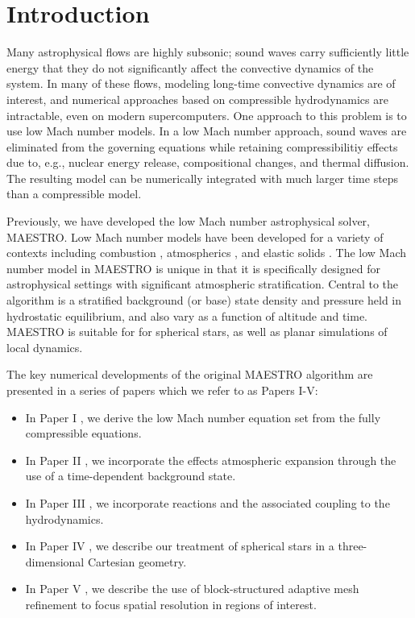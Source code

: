 \documentclass{aastex62}
\begin{document}
\section{Introduction} \label{sec:intro}

Many astrophysical flows are highly subsonic; sound waves carry sufficiently little energy that they do not significantly affect the convective dynamics of the system.
In many of these flows, modeling long-time convective dynamics are of interest, and numerical approaches based on compressible hydrodynamics are intractable, even on modern supercomputers.
One approach to this problem is to use low Mach number models.
In a low Mach number approach, sound waves are eliminated from the governing equations while retaining compressibilitiy effects due to, e.g., nuclear energy release, compositional changes, and thermal diffusion.
The resulting model can be numerically integrated with much larger time steps than a compressible model.

Previously, we have developed the low Mach number astrophysical solver, MAESTRO.
Low Mach number models have been developed for a variety of contexts including combustion \citep{day2000numerical}, atmospherics \citep{duarte2015low}, and elastic solids \citep{abbate2017all}.
The low Mach number model in MAESTRO is unique in that it is specifically designed for astrophysical settings with significant atmospheric stratification.
Central to the algorithm is a stratified background (or base) state density and pressure held in hydrostatic equilibrium, and also vary as a function of altitude and time.
MAESTRO is suitable for for spherical stars, as well as planar simulations of local dynamics.

The key numerical developments of the original MAESTRO algorithm are presented in a series of papers which we refer to as Papers I-V:
\begin{itemize}
\item In Paper I \citep{MAESTRO_I}, we derive the low Mach number equation set from the fully compressible equations.
\item In Paper II \citep{MAESTRO_II}, we incorporate the effects atmospheric expansion through the use of a time-dependent background state.
\item In Paper III \citep{MAESTRO_III}, we incorporate reactions and the associated coupling to the hydrodynamics.
\item In Paper IV \citep{MAESTRO_IV}, we describe our treatment of spherical stars in a three-dimensional Cartesian geometry.
\item In Paper V \citep{MAESTRO_V}, we describe the use of block-structured adaptive mesh refinement to focus spatial resolution in regions of interest.
\end{itemize} 
\end{document}
